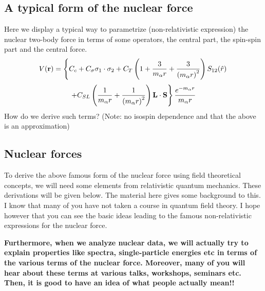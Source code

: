 \documentclass[%
twoside,                 %
final,                   %
10pt]{article}
\begin{document}
\subsection{A typical form of the nuclear force}
\begin{block}{}
Here we display a typical way to parametrize (non-relativistic expression) the nuclear two-body force
in terms of some operators, the central part, the spin-spin part and the central force.
\[
V(\mathbf{r})= \left\{ C_c + C_\mathbf{\sigma} \mathbf{\sigma}_1\cdot\mathbf{\sigma}_2
 + C_T \left( 1 + {3\over m_\alpha r} + {3\over\left(m_\alpha r\right)^2}\right) S_{12} (\hat r)\right. 
\]
\[
\left. + C_{SL} \left( {1\over m_\alpha r} + {1\over \left( m_\alpha r\right)^2}
\right) \mathbf{L}\cdot \mathbf{S}
\right\} \frac{e^{-m_\alpha r}}{m_\alpha r}
\]
How do we derive such terms?  (Note: no isospin dependence and that the above is an approximation)
\end{block}


\subsection{Nuclear forces}
\begin{block}{}
To derive the above famous form of the nuclear force using field theoretical concepts, we will need some 
elements from relativistic quantum mechanics. These derivations will be given below. 
The material here gives some background to this.
I know that many of you have not taken a course in quantum field theory. I hope however that you can see the basic ideas leading to the famous non-relativistic expressions for the nuclear force. 

\textbf{Furthermore, when we analyze nuclear data, we will actually try to explain properties like spectra, single-particle energies etc in terms of the various terms of the nuclear force. Moreover, many of you will hear about these terms at various talks, workshops, seminars etc. Then, it is good to have an idea of what people actually mean!!}
\end{block}  

\end{document}

